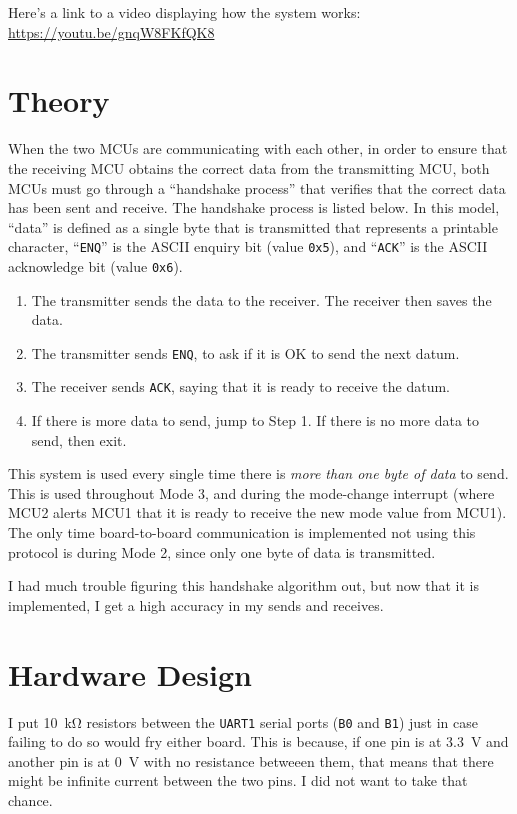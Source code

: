 \documentclass{article}
\renewcommand{\c}[1]{\texttt{#1}}
\begin{document}
Here's a link to a video displaying how the system works:
\url{https://youtu.be/gnqW8FKfQK8}

\section{Theory}
When the two MCUs are communicating with each other,
in order to ensure that the receiving MCU obtains the correct
data from the transmitting MCU, both MCUs must go through a
``handshake process'' that verifies that the correct data
has been sent and receive. The handshake process is listed below.
In this model, ``data'' is defined as a single byte that is
transmitted that represents a printable character, ``\c{ENQ}''
is the ASCII enquiry bit (value \c{0x5}), and ``\c{ACK}'' is
the ASCII acknowledge bit (value \c{0x6}).
\begin{enumerate}
	\item The transmitter sends the data to the receiver. The
	receiver then saves the data.
	\item The transmitter sends \c{ENQ}, to ask if it is OK
	to send the next datum.
	\item The receiver sends \c{ACK}, saying that it is ready
	to receive the datum.
	\item If there is more data to send, jump to Step 1. If
	there is no more data to send, then exit.
\end{enumerate}

This system is used every single time there is
\emph{more than one
byte of data} to send. This is used throughout Mode 3, and
during the mode-change interrupt (where MCU2 alerts MCU1
that it is ready to receive the new mode value from MCU1).
The only time board-to-board communication is implemented not
using this protocol is during Mode 2, since only one byte of
data is transmitted.

I had much trouble figuring this handshake algorithm out,
but now that it is implemented, I get a high accuracy in my
sends and receives.

\section{Hardware Design}
I put \SI{10}{\kilo\ohm} resistors between the \c{UART1} serial
ports (\c{B0} and \c{B1}) just in case failing to do so would
fry either board. This is because, if one pin is at
\SI{3.3}{\volt} and another pin is at \SI{0}{\volt}
with no resistance betweeen them, that means
that there might be infinite current between the two pins.
I did not want to take that chance.
\end{document}
